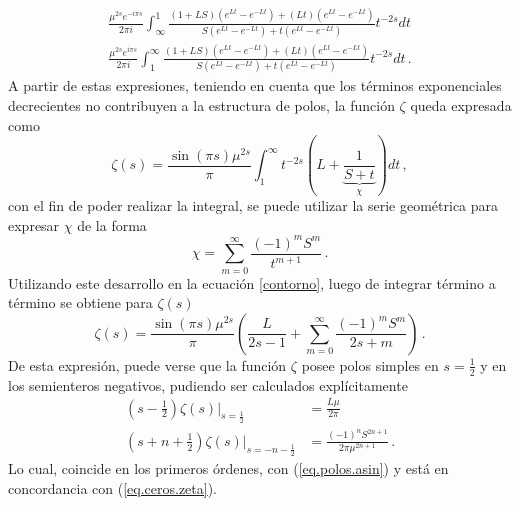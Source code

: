 \begin{align}
\label{eq.tirados}
\frac{\mu ^{2s} e ^{-i \pi s}}{2 \pi i} \int _{\infty} ^{1} 
	\frac{(1+L S) \left( e^{L t} - e ^{- L t} \right) +
			(L t) \left( e ^{L t} - e^{- L t} \right)
			}
			{S \left( e ^{L t} - e ^{- L t} \right) + 
			t \left( e ^{L t} - e ^{-L t} \right)}
			t ^{-2s} dt 
\nonumber			
\\[7pt]
\frac{\mu ^{2s} e ^{i \pi s}}{2 \pi i} \int _{1} ^{\infty} 
	\frac{(1+L S) \left( e^{L t} - e ^{- L t} \right) +
			(L t) \left( e ^{L t} - e^{- L t} \right)
			}
			{S \left( e ^{L t} - e ^{- L t} \right) + 
			t \left( e ^{L t} - e ^{-L t} \right)}
			t ^{-2s} dt
			\, .
\end{align}
A partir de estas expresiones, teniendo en cuenta que los términos exponenciales decrecientes no contribuyen a la estructura de polos, la función $\zeta$ queda expresada como
\begin{equation}
	\zeta  (s) = 
    \frac{ \sin (\pi s) \mu ^{2s}}{ \pi } 
    \int _1 ^{\infty} 
    t^{-2s}
    \left(
    	L + 
	    \underbrace
    	{
		\frac{1}{S + t}   
		} _{\chi} 
	\right)
    dt  \,  ,
\label{contorno}
\end{equation}
con el fin de poder realizar la integral, se puede utilizar la serie geométrica para expresar $\chi$ de la forma
\begin{equation}
    \chi =   \sum _{m=0} ^{\infty} \frac{(-1) ^{m} S ^{m} }{t ^{m+1}}
    \, .
\label{eq:chi}
\end{equation}
Utilizando este desarrollo en la ecuación \eqref{contorno}, luego de integrar término a término se obtiene para $\zeta (s)$
\begin{equation}\label{eq.seta}
    \zeta  (s) = 
    \frac{ \sin(\pi s) \mu ^{2s }}{\pi } 
    \left(
    \frac{L}{2s-1} + 
    \sum _{m=0} ^{\infty}
    \frac{(-1) ^{m} S ^{m} }{2s+m}
    \right) \, .
\end{equation}
De esta expresión, puede verse que la función $\zeta$ posee polos simples en $s=\frac{1}{2}$ y en los semienteros negativos, pudiendo ser calculados explícitamente
\begin{equation}
\begin{aligned}
\left(s-\frac{1}{2} \right) \zeta(s) |_{s=\frac{1}{2}} &= \frac{L \mu }{2 \pi}   \\
\left( s + n + \frac{1}{2} \right)
\zeta (s ) |_{s= -n - \frac{1}{2}}  &= \frac{ (-1) ^n S ^{2n+1}  }{2 \pi \mu ^{2n + 1}} 
\, .
\end{aligned}
\label{eq.polos.complejo}
\end{equation}
Lo cual, coincide en los primeros órdenes, con (\ref{eq.polos.asin}) y está en concordancia  con (\ref{eq.ceros.zeta}).

